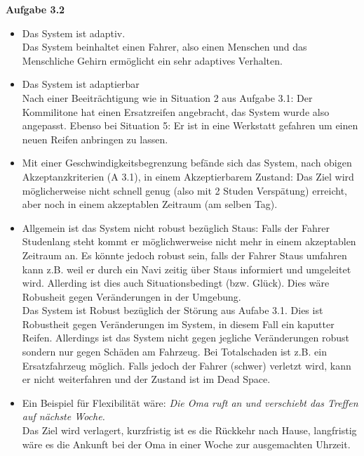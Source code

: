 \documentclass[paper=a4, %
         fontsize=10,  %
         oneside,        %
         headsepline,    %
         notitlepage    %
]{scrartcl}              %
\newcommand{\aufgabe}[1]{\vspace*{0.5cm}\large{\textbf{\textsf{Aufgabe #1}}}\normalsize\vspace*{0.5cm}}
\begin{document}
\aufgabe{3.2}

\begin{itemize}
\item Das System ist adaptiv. \\
Das System beinhaltet einen Fahrer, also einen Menschen und das Menschliche Gehirn ermöglicht ein sehr adaptives Verhalten.

\item Das System ist adaptierbar\\ 
Nach einer Beeiträchtigung wie in Situation 2 aus Aufgabe 3.1: Der Kommilitone hat einen Ersatzreifen angebracht, das System wurde also angepasst. Ebenso bei Situation 5: Er ist in eine Werkstatt gefahren um einen neuen Reifen anbringen zu lassen.

\item Mit einer Geschwindigkeitsbegrenzung befände sich das System, nach obigen Akzeptanzkriterien (A 3.1), in einem Akzeptierbarem Zustand:
Das Ziel wird möglicherweise nicht schnell genug (also mit 2 Studen Verspätung) erreicht, aber noch in einem akzeptablen Zeitraum (am selben Tag).

\item 
Allgemein ist das System nicht robust bezüglich Staus: Falls der Fahrer Studenlang steht kommt er möglichwerweise nicht mehr in einem akzeptablen Zeitraum an.
Es könnte jedoch robust sein, falls der Fahrer Staus umfahren kann z.B. weil er durch ein Navi zeitig über Staus informiert und umgeleitet wird. 
Allerding ist dies auch Situationsbedingt (bzw. Glück). Dies wäre Robusheit gegen Veränderungen in der Umgebung.\\
Das System ist Robust bezüglich der Störung aus Aufabe 3.1. Dies ist Robustheit gegen Veränderungen im System, in diesem Fall ein kaputter Reifen.
Allerdings ist das System nicht gegen jegliche Veränderungen robust sondern nur gegen Schäden am Fahrzeug. Bei Totalschaden ist z.B. ein Ersatzfahrzeug möglich. Falls jedoch der Fahrer (schwer) verletzt wird, kann er nicht weiterfahren und der Zustand ist im Dead Space.


\item 
    Ein Beispiel für Flexibilität wäre: \textit{Die Oma ruft an und verschiebt das Treffen auf nächste Woche.} \\
    Das Ziel wird verlagert, kurzfristig ist es die Rückkehr nach Hause, langfristig wäre es die Ankunft bei der Oma in einer Woche zur ausgemachten Uhrzeit.

\bigskip
\begin{tikzpicture}[ >=stealth', very thick, scale=0.7,
  gap/.style={draw,circle,minimum width=0.75cm,inner sep=0,dashed,fill=white,align=center}]


\end{tikzpicture}
\end{itemize}
\end{document}
